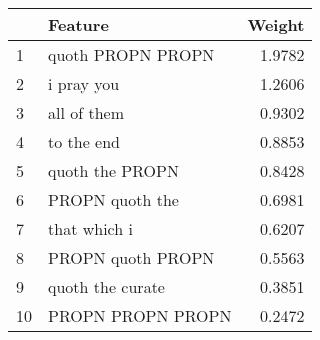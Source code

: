 \begin{tabular}{llr}
\toprule
{} &            Feature &  Weight \\
\midrule
1  &  quoth PROPN PROPN &  1.9782 \\
2  &         i pray you &  1.2606 \\
3  &        all of them &  0.9302 \\
4  &         to the end &  0.8853 \\
5  &    quoth the PROPN &  0.8428 \\
6  &    PROPN quoth the &  0.6981 \\
7  &       that which i &  0.6207 \\
8  &  PROPN quoth PROPN &  0.5563 \\
9  &   quoth the curate &  0.3851 \\
10 &  PROPN PROPN PROPN &  0.2472 \\
\bottomrule
\end{tabular}
